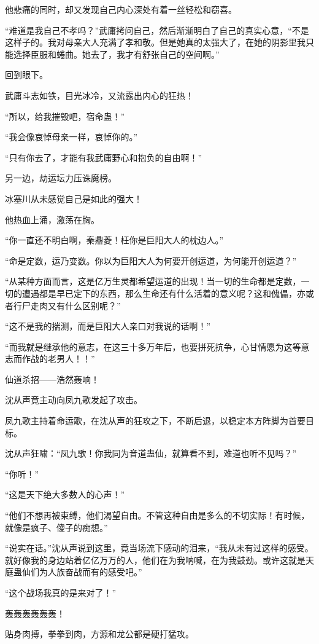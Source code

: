 \begin{this_body}
他悲痛的同时，却又发现自己内心深处有着一丝轻松和窃喜。

“难道是我自己不孝吗？”武庸拷问自己，然后渐渐明白了自己的真实心意，“不是这样子的。我对母亲大人充满了孝和敬。但是她真的太强大了，在她的阴影里我只能选择臣服和蜷曲。她去了，我才有舒张自己的空间啊。”

回到眼下。

武庸斗志如铁，目光冰冷，又流露出内心的狂热！

“所以，给我摧毁吧，宿命蛊！”

“我会像哀悼母亲一样，哀悼你的。”

“只有你去了，才能有我武庸野心和抱负的自由啊！”

另一边，劫运坛力压诛魔榜。

冰塞川从未感觉自己是如此的强大！

他热血上涌，激荡在胸。

“你一直还不明白啊，秦鼎菱！枉你是巨阳大人的枕边人。”

“命是定数，运乃变数。你以为巨阳大人为何要开创运道，为何能开创运道？”

“从某种方面而言，这是亿万生灵都希望运道的出现！当一切的生命都是定数，一切的遭遇都是早已定下的东西，那么生命还有什么活着的意义呢？这和傀儡，亦或者行尸走肉又有什么区别呢？”

“这不是我的揣测，而是巨阳大人亲口对我说的话啊！”

“而我就是继承他的意志，在这三十多万年后，也要拼死抗争，心甘情愿为这等意志而作战的老男人！！”

仙道杀招——浩然轰响！

沈从声竟主动向凤九歌发起了攻击。

凤九歌主持着命运歌，在沈从声的狂攻之下，不断后退，以稳定本方阵脚为首要目标。

沈从声狂啸：“凤九歌！你我同为音道蛊仙，就算看不到，难道也听不见吗？”

“你听！”

“这是天下绝大多数人的心声！”

“他们不想再被束缚，他们渴望自由。不管这种自由是多么的不切实际！有时候，就像是疯子、傻子的痴想。”

“说实在话。”沈从声说到这里，竟当场流下感动的泪来，“我从未有过这样的感受。就好像我的身边站着亿亿万万的人，他们在为我呐喊，在为我鼓劲。或许这就是天庭蛊仙们为人族奋战而有的感受吧。”

“这个战场我真的是来对了！”

轰轰轰轰轰轰！

贴身肉搏，拳拳到肉，方源和龙公都是硬打猛攻。


\end{this_body}
